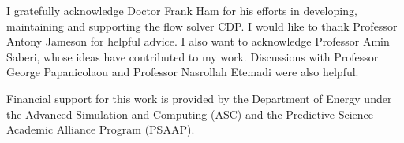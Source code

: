 
I gratefully acknowledge Doctor Frank Ham for his efforts in developing,
maintaining and supporting the flow solver CDP.
I would like to thank Professor Antony Jameson for helpful advice.
I also want to acknowledge Professor Amin Saberi, whose ideas have contributed
to my work.  Discussions with Professor George Papanicolaou
and Professor Nasrollah Etemadi were also helpful.

Financial support for this work is provided by the Department of Energy
under the Advanced Simulation and Computing (ASC) and the
Predictive Science Academic Alliance Program (PSAAP).
